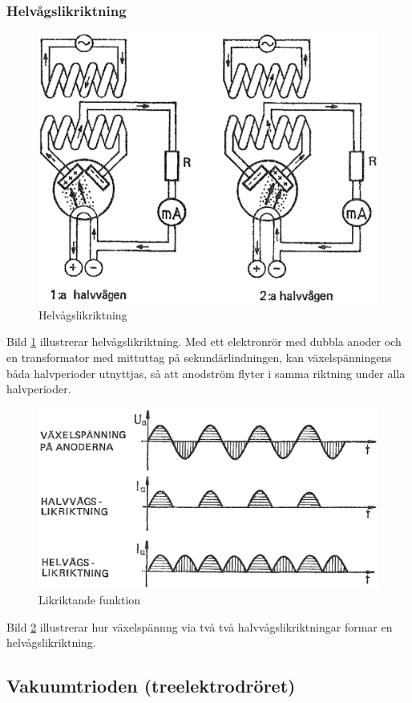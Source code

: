 \subsubsection{Helvågslikriktning}

\begin{figure}
\includegraphics[width=.7\textwidth]{images/cropped_pdfs/bild_2_2-28.pdf}
\caption{Helvågslikriktning}
\label{fig:BildII2-28}
\end{figure}

Bild \ref{fig:BildII2-28} illustrerar helvågslikriktning. Med ett
elektronrör med dubbla anoder och en transformator med mittuttag på
sekundärlindningen, kan växelspänningens båda halvperioder utnyttjas,
så att anodström flyter i samma riktning under alla halvperioder.

\begin{figure}
\includegraphics[width=.7\textwidth]{images/cropped_pdfs/bild_2_2-29.pdf}
\caption{Likriktande funktion}
\label{fig:BildII2-29}
\end{figure}

Bild \ref{fig:BildII2-29} illustrerar hur växelspännng via två
två halvvågslikriktningar formar en helvågslikriktning.

\subsection{Vakuumtrioden (treelektrodröret)}

